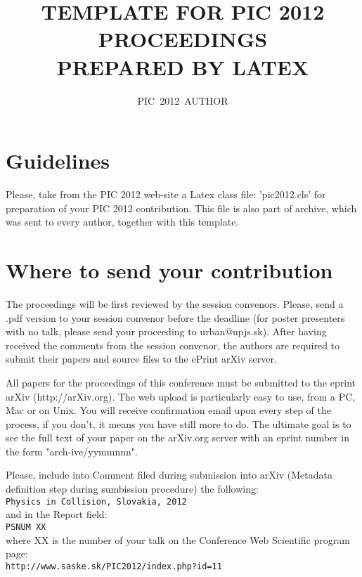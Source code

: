\documentclass{pic2012}
\begin{document}
\title{TEMPLATE FOR PIC 2012 PROCEEDINGS \\
PREPARED BY LATEX
}


\author{PIC~2012~AUTHOR}

\address{Institute of Experimental Physics SAS\\
Watsonova 47, 040 01 Ko\v{s}ice, Slovak Republic\\
E-mail: pic@saske.sk }

\maketitle



\section{Guidelines} Please, take from
the PIC 2012 web-site a Latex class file: 'pic2012.cls' for
preparation of your PIC 2012 contribution. This file is also part of archive, which was sent to every author, together with this template.

\section{Where to send your contribution}
 The proceedings will be first reviewed by the session convenors.
  Please, send a .pdf version to your session convenor before the
   deadline (for poster presenters with no talk, please send your
  proceeding to urban@upjs.sk). After having received the comments from
    the session convenor, the authors are required to submit their papers 
     and source files to the ePrint arXiv server.

All papers for the proceedings of this conference must be submitted to the eprint arXiv (http://arXiv.org). The web upload is particularly easy to use, from a PC, Mac or on Unix. You will receive confirmation email upon every step of the process, if you don't, it means you have still more to do. The ultimate goal is to see the full text of your paper on the arXiv.org server with an eprint number in the form "arch-ive/yymmnnn".

Please, include into Comment filed during submission into arXiv (Metadata definition step during sumbission procedure) the following:\\
{\tt Physics in Collision, Slovakia, 2012}\\
and in the Report field:\\
{\tt PSNUM XX}\\
where XX is the number of your talk on the Conference Web Scientific program page:\\
{\tt http://www.saske.sk/PIC2012/index.php?id=11}
\end{document}
